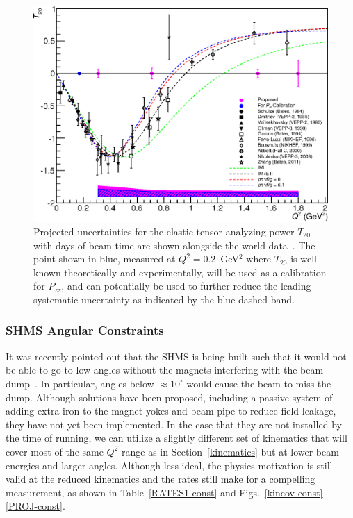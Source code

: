 \begin{figure}
\begin{center}
\includegraphics[width=\textwidth]{figs/plot_t20_fit.eps} 
\caption{\label{PROJ-T20}Projected uncertainties for the elastic tensor analyzing power $T_{20}$ with \productiondays days of beam time are shown alongside the world data~\cite{Holt:2012gg}. The point shown in blue, measured at $Q^2=0.2$~GeV$^2$ where $T_{20}$ is well known theoretically and experimentally, will be used as a calibration for $P_{zz}$, and can potentially be used to further reduce the leading systematic uncertainty as indicated by the blue-dashed band.
}
\end{center}
\end{figure}

\iffalse
\subsubsection{SHMS Angular Constraints}

It was recently pointed out that the SHMS is being built such that it would not be able to go to low angles without the magnets interfering with the beam dump~\cite{Moore:2014sxa}. In particular, angles below $\approx10^{\circ}$ would cause the beam to miss the dump. Although solutions have been proposed, including a passive system of adding extra iron to the magnet yokes and beam pipe to reduce field leakage, they have not yet been implemented. In the case that they are not installed by the time of running, we can utilize a slightly different set of kinematics that will cover most of the same $Q^2$ range as in Section~\ref{kinematics} but at lower beam energies and larger angles. Although less ideal, the physics motivation is still valid at the reduced kinematics and the rates still make for a compelling measurement, as shown in Table~\ref{RATES1-const} and Figs.~\ref{kincov-const}-\ref{PROJ-const}.

